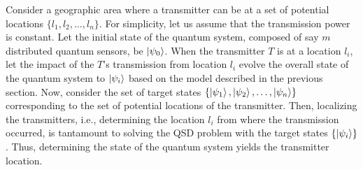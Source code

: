 

Consider a geographic area where a transmitter can be at a set of potential locations $\{l_1, l_2, \ldots, l_n\}$. 
For simplicity, let us assume that the transmission power is constant.
Let the initial state of the quantum system, composed of say $m$ distributed quantum sensors,
be $\ket{\psi_0}$. 
When the transmitter $T$ is at a location $l_i$, let the impact of the $T$'s transmission from location $l_i$ evolve the overall state of the quantum system to $\ket{\psi_i}$ 
based on the model described in the previous section.
Now, consider the set of target states $\{\ket{\psi_1}, \ket{\psi_2}, \ldots, \ket{\psi_n}\}$ corresponding to the set of potential locations of the transmitter. Then, localizing the transmitters, i.e., determining the location $l_i$ from where the transmission occurred, is
tantamount to solving the QSD problem with the target states $\{\ket{\psi_i}\}$.
Thus, determining the state of the quantum system yields
the transmitter location.

